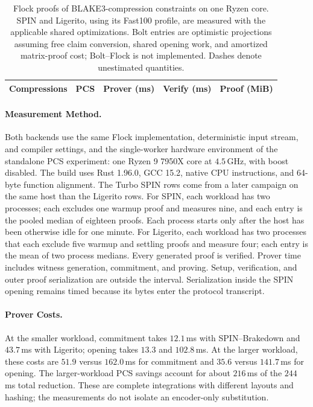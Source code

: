 \begin{table}[tb]
\centering
\caption{Flock proofs of BLAKE3-compression constraints on one Ryzen
core. SPIN and Ligerito, using its Fast100 profile, are measured with the
applicable shared optimizations. Bolt entries are optimistic projections assuming free claim
conversion, shared opening work, and amortized matrix-proof cost;
Bolt--Flock is not implemented. Dashes denote unestimated quantities.}
\label{tab:spin-flock}
\small
\begin{tabular}{@{}rlrrr@{}}
\toprule
Compressions & PCS & Prover (ms) & Verify (ms) & Proof (MiB) \\
\midrule

\end{tabular}
\end{table}

\paragraph{Measurement Method.}
Both backends use the same Flock implementation, deterministic input stream,
and compiler settings, and the single-worker hardware environment of the
standalone PCS experiment: one Ryzen 9 7950X core at $4.5$\,GHz, with boost
disabled. The build uses Rust 1.96.0, GCC 15.2, native CPU instructions, and
64-byte function alignment. The Turbo SPIN rows come from a later campaign on
the same host than the Ligerito rows. For SPIN, each workload has two
processes; each excludes one warmup proof and measures nine, and each entry
is the pooled median of eighteen proofs. Each process starts only after the
host has been otherwise idle for one minute. For Ligerito, each workload has
two processes that each exclude five warmup and settling proofs and measure
four; each entry is the mean of two process medians. Every generated proof
is verified.
Prover time includes witness generation, commitment, and proving. Setup,
verification, and outer proof serialization are outside the interval.
Serialization inside the SPIN opening remains timed because its bytes
enter the protocol transcript.

\paragraph{Prover Costs.}
At the smaller workload, commitment takes $12.1$\,ms with SPIN--Brakedown
and $43.7$\,ms with Ligerito; opening takes $13.3$ and $102.8$\,ms.
At the larger workload, these costs are $51.9$ versus $162.0$\,ms for
commitment and $35.6$ versus $141.7$\,ms for opening. The larger-workload
PCS savings account for about $216$\,ms of the $244$\,ms total reduction.
These are complete integrations with different layouts and hashing; the
measurements do not isolate an encoder-only substitution.

